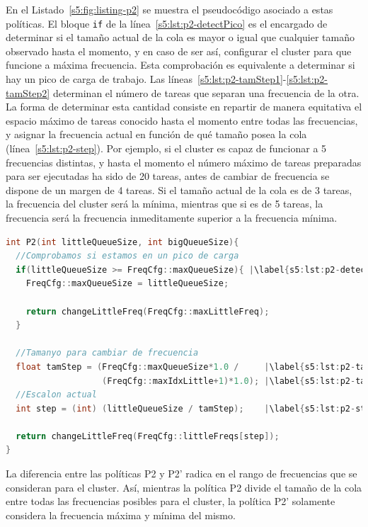 En el Listado~\ref{s5:fig:listing-p2} se muestra el pseudocódigo
asociado a estas políticas. El bloque \texttt{if} de la
línea~\ref{s5:lst:p2-detectPico} es el encargado de determinar si el tamaño
actual de la cola es mayor o igual que cualquier tamaño observado hasta el momento, y
en caso de ser así, configurar el cluster para que funcione a máxima
frecuencia. Esta comprobación es equivalente a determinar si hay un pico de carga de
trabajo. Las líneas~\ref{s5:lst:p2-tamStep1}-\ref{s5:lst:p2-tamStep2}
determinan el número de tareas que separan una frecuencia de la otra. La
forma de determinar esta cantidad consiste en repartir de manera equitativa
el espacio máximo de tareas conocido hasta el momento entre todas las
frecuencias, y asignar la frecuencia actual en función de qué tamaño posea
la cola (línea~\ref{s5:lst:p2-step}). Por ejemplo, si el cluster es capaz
de funcionar a 5 frecuencias distintas, y hasta el momento el número
máximo de tareas preparadas para ser ejecutadas ha sido de 20 tareas, antes
de cambiar de frecuencia se dispone de un margen de 4 tareas. Si el tamaño
actual de la cola es de 3 tareas, la frecuencia del cluster será la mínima,
mientras que si es de 5 tareas, la frecuencia será la frecuencia
inmeditamente superior a la frecuencia mínima.

\begin{lstlisting}[float,language=C++,caption={Pseudocódigo para las políticas P2 y P2'.},label={s5:fig:listing-p2}]
int P2(int littleQueueSize, int bigQueueSize){      
  //Comprobamos si estamos en un pico de carga
  if(littleQueueSize >= FreqCfg::maxQueueSize){ |\label{s5:lst:p2-detectPico}|
    FreqCfg::maxQueueSize = littleQueueSize;

    return changeLittleFreq(FreqCfg::maxLittleFreq);
  }

  //Tamanyo para cambiar de frecuencia
  float tamStep = (FreqCfg::maxQueueSize*1.0 /     |\label{s5:lst:p2-tamStep1}|
                   (FreqCfg::maxIdxLittle+1)*1.0); |\label{s5:lst:p2-tamStep2}|
  //Escalon actual
  int step = (int) (littleQueueSize / tamStep);    |\label{s5:lst:p2-step}|

  return changeLittleFreq(FreqCfg::littleFreqs[step]);
}
\end{lstlisting}

La diferencia entre las políticas P2 y P2' radica en el rango de
frecuencias que se consideran para el cluster. Así, mientras la política P2
divide el tamaño de la cola entre todas las frecuencias posibles para el
cluster, la política P2' solamente considera la frecuencia máxima y mínima
del mismo.

